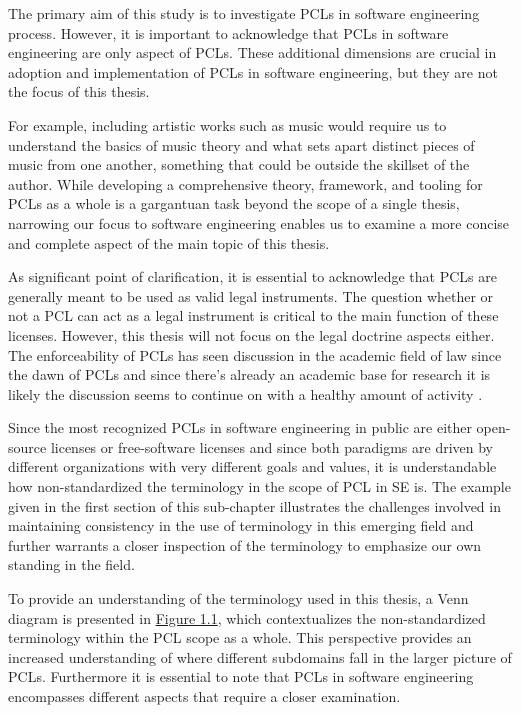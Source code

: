 The primary aim of this study is to investigate PCLs in software engineering process. However, it is important to acknowledge that PCLs in software engineering are only aspect of PCLs. These additional dimensions are crucial in adoption and implementation of PCLs in software engineering, but they are not the focus of this thesis.

For example, including artistic works such as music would require us to understand the basics of music theory and what sets apart distinct pieces of music from one another, something that could be outside the skillset of the author. While developing a comprehensive theory, framework, and tooling for PCLs as a whole is a gargantuan task beyond the scope of a single thesis, narrowing our focus to software engineering enables us to examine a more concise and complete aspect of the main topic of this thesis. 

As significant point of clarification, it is essential to acknowledge that PCLs are generally meant to be used as valid legal instruments. The question whether or not a PCL can act as a legal instrument is critical to the main function of these licenses. However, this thesis will not focus on the legal doctrine aspects either. The enforceability of PCLs has seen discussion in the academic field of law since the dawn of PCLs and since there's already an academic base for research it is likely the discussion seems to continue on with a healthy amount of activity \citep{duisburg2011gpl}.

Since the most recognized PCLs in software engineering in public are either open-source licenses or free-software licenses and since both paradigms are driven by different organizations with very different goals and values, it is understandable how non-standardized the terminology in the scope of PCL in SE is. The example given in the first section of this sub-chapter illustrates the challenges involved in maintaining consistency in the use of terminology in this emerging field and further warrants a closer inspection of the terminology to emphasize our own standing in the field.

To provide an understanding of the terminology used in this thesis, a Venn diagram is presented in \hyperref[fig:terms]{Figure 1.1}, which contextualizes the non-standardized terminology within the PCL scope as a whole. This perspective provides an increased understanding of where different subdomains fall in the larger picture of PCLs. Furthermore it is essential to note that PCLs in software engineering encompasses different aspects that require a closer examination.


